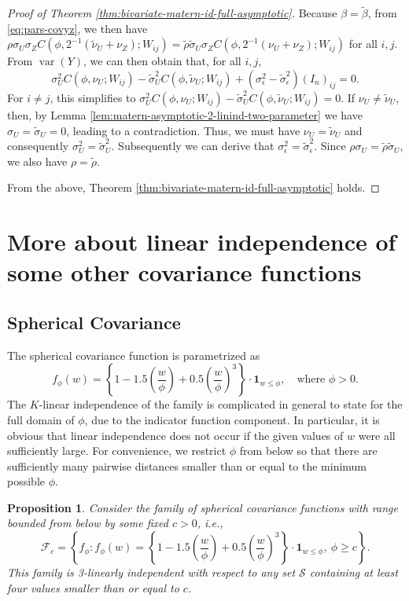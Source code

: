 \documentclass[11pt]{article}
\newtheorem{proposition}{Proposition}
\theoremstyle{definition}
\theoremstyle{remark}
\DeclareMathOperator{\var}{var}
\begin{document}
\begin{proof}[Proof of Theorem \ref{thm:bivariate-matern-id-full-asymptotic}]
Because $\beta = \tilde\beta$, from \eqref{eq:pars-covyz}, we then have $\rho\sigma_U\sigma_Z C(\phi, 2^{-1}(\tilde\nu_U+\nu_Z); W_{ij}) = \tilde\rho\tilde\sigma_U \sigma_Z C(\phi, 2^{-1}(\nu_U+\nu_Z); W_{ij})$ for all $i,j$. 
From $\var(Y)$,  we can then obtain that, for all $i,j$, 
\[\sigma_U^2 C(\phi, \nu_U; W_{ij}) - \tilde\sigma_U^2 C(\phi, \tilde\nu_U; W_{ij}) + (\sigma_\epsilon^2 - \tilde\sigma_\epsilon^2) (I_n)_{ij} =0.\]
For $i \neq j$, this simplifies to $\sigma_U^2 C(\phi, \nu_U; W_{ij}) - \tilde\sigma_U^2 C(\phi, \tilde\nu_U; W_{ij})=0$. If $\nu_U\neq \tilde\nu_U$, then, by Lemma \ref{lem:matern-asymptotic-2-linind-two-parameter} we have $\sigma_U=\tilde\sigma_U=0$, leading to a contradiction.  Thus, we must have $\nu_U=\tilde\nu_U$ and consequently  $\sigma^2_U = \tilde{\sigma}^2_U$. 
Subsequently we can derive that $\sigma_\epsilon^2 = \tilde\sigma_\epsilon^2$. 
Since  $\rho\sigma_U = \tilde\rho \tilde\sigma_U$, we also have $\rho = \tilde\rho$. 

From the above, Theorem \ref{thm:bivariate-matern-id-full-asymptotic} holds. 
\end{proof}


\section{More about linear independence of some other covariance functions}\label{sec:linear-non-ind}

\subsection{Spherical Covariance}

The spherical covariance function is parametrized as 
$$
f_\phi(w) = \left\{ 1 - 1.5\left(\frac{w}{\phi}\right) + 0.5\left(\frac{w}{\phi}\right)^3\right\} \cdot \mathbf{1}_{w\le\phi}, 
\quad \text{where } \phi > 0.
$$ 
The $K$-linear independence of the family is complicated in general to state for the full domain of $\phi$, 
due to the indicator function component. In particular, it is obvious that linear independence does not occur if the given values of $w$ were all sufficiently large.  
For convenience, we 
restrict $\phi$ from below so that there are sufficiently many pairwise distances smaller than or equal to the minimum possible $\phi$.

\begin{proposition}\label{spherical-3-lin-ind}
Consider the family of spherical covariance functions with range bounded from below by some fixed $c>0$, i.e.,  
$$
\mathcal{F}_{c}= \left\{f_\phi: f_\phi(w) = \left\{ 1 - 1.5\left(\frac{w}{\phi}\right) + 0.5\left(\frac{w}{\phi}\right)^3\right\} \cdot \mathbf{1}_{w\le\phi}, \ \phi \ge c\right\}. 
$$
This family is 3-linearly independent with respect to any set $\mathcal{S}$ containing at least four values smaller than or equal to $c$.
\end{proposition}
\end{document}
